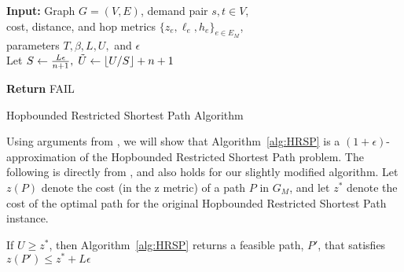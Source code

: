 \begin{algorithm}[h]
\DontPrintSemicolon

\textbf{Input:} Graph $G = (V, E)$, demand pair $s,t \in V$, \\
cost, distance, and hop metrics $\{z_e, \ell_e, h_e \}_{e \in E_M}$, \\
parameters $T, \beta, L, U,$ and $\epsilon $ \;~\\

Let $S \gets \frac{L \epsilon}{n+1}, \; \Tilde{U} \gets \floor*{U/S} + n + 1$ \\ \;

 \;

    
 \;

\textbf{Return} FAIL \;

\caption{\label{alg:HRSP} Hopbounded Restricted Shortest Path Algorithm } 
\end{algorithm}

Using arguments from \cite{LR01}, we will show that Algorithm~\ref{alg:HRSP} is a $(1+\epsilon)$-approximation of the Hopbounded Restricted Shortest Path problem. The following is directly from \cite{LR01}, and also holds for our slightly modified algorithm. Let $z(P)$ denote the cost (in the $\bm{\mathrm{z}}$ metric) of a path $P$ in $G_M$, and let $z^*$ denote the cost of the optimal path for the original Hopbounded Restricted Shortest Path instance.

\begin{lemma}
\label{lem:eps_approx}
    If $U \geq z^*$, then Algorithm~\ref{alg:HRSP} returns a feasible path, $P'$, that satisfies $z(P') \leq z^* + L\epsilon$
\end{lemma}

